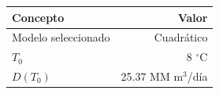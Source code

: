 \begin{tabular}{l r}
\toprule
Concepto & Valor \\
\midrule
Modelo seleccionado & Cuadrático \\
$T_0$ & \num{8} $^\circ$C \\
$D(T_0)$ & \num{25.37} MM m$^3$/día \\
\bottomrule
\end{tabular}
